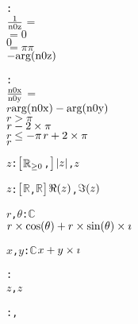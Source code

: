 \begin{alltt}
  : 
    \pvsid{(}\(\opdividetwofn{1}{\pvsid{n0z}}\)\pvsid{)} \(=\)
      \pvsid{(}\pvsid{)} \(=\) \(0\)
        \(0\)
      \pvsid{(}\pvsid{)} \(=\) \(\pi\)  \(\pi\)
      \(\opdifferenceonefn{\pvsid{arg}\pvsid{(}\pvsid{n0z}\pvsid{)}}\)
     \vspace*{\pvsdeclspacing}

  : 
    \pvsid{(}\(\opdividetwofn{\pvsid{n0x}}{\pvsid{n0y}}\)\pvsid{)} \(=\)
      \(r\) \pvskey{=} \(\opdifferencetwofn{\pvsid{arg}\pvsid{(}\pvsid{n0x}\pvsid{)}}{\pvsid{arg}\pvsid{(}\pvsid{n0y}\pvsid{)}}\) 
        \(r\) \(>\) \(\pi\)
          \(\opdifferencetwofn{r}{\optimestwofn{2}{\pi}}\)
        \(r\) \(\leq\) \(\opdifferenceonefn{\pi}\)  \(\opplustwofn{r}{\optimestwofn{2}{\pi}}\)
        \(r\)
       \vspace*{\pvsdeclspacing}

  \pvsid{(}\(z\)\pvsid{)}: \({\pvsbracketl}\)\({\pvssubscript{\mathbb{R}}{{\geq}0}}\), \({\pvsbracketr}\) \pvskey{=} \pvsid{(}\(\absonefn{z}\), \pvsid{(}\(z\)\pvsid{)}\pvsid{)}\vspace*{\pvsdeclspacing}

  \pvsid{(}\(z\)\pvsid{)}: \({\pvsbracketl}\)\(\mathbb{R}\), \(\mathbb{R}\)\({\pvsbracketr}\) \pvskey{=} \pvsid{(}\(\Reonefn{z}\), \(\Imonefn{z}\)\pvsid{)}\vspace*{\pvsdeclspacing}

  \pvsid{(}\(r\), \(\theta\)\pvsid{)}: \(\mathbb{C}\) \pvskey{=}
      \(\opplustwofn{\optimestwofn{r}{\pvsid{cos}\pvsid{(}\theta\pvsid{)}}}{\optimestwofn{\optimestwofn{r}{\pvsid{sin}\pvsid{(}\theta\pvsid{)}}}{{\imath}}}\)\vspace*{\pvsdeclspacing}

  \pvsid{(}\(x\), \(y\)\pvsid{)}: \(\mathbb{C}\) \pvskey{=} \(\opplustwofn{x}{\optimestwofn{y}{{\imath}}}\)\vspace*{\pvsdeclspacing}

  : 
    \pvsid{(}\(z\), \pvsid{(}\pvsid{(}\(z\)\pvsid{)}\pvsid{)}\pvsid{)}\vspace*{\pvsdeclspacing}

  :  \pvsid{(}, \pvsid{(}\pvsid{(}\pvsid{)}\pvsid{)}\pvsid{)}\vspace*{\pvsdeclspacing}

  \end{alltt}
